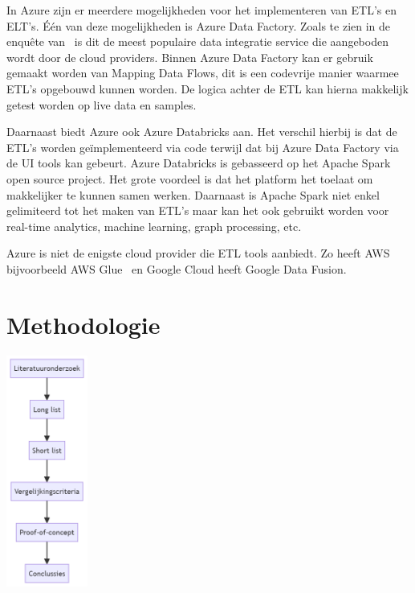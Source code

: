 In Azure zijn er meerdere mogelijkheden voor het implementeren van ETL's en ELT's. Één van deze mogelijkheden is Azure Data Factory. Zoals te zien in de enquête van~\textcite{Sreemathy2021} is dit de meest populaire data integratie service die aangeboden wordt door de cloud providers. Binnen Azure Data Factory kan er gebruik gemaakt worden van Mapping Data Flows, dit is een codevrije manier waarmee ETL's opgebouwd kunnen worden. De logica achter de ETL kan hierna makkelijk getest worden op live data en samples.~\autocite{Kromer2022a} 

Daarnaast biedt Azure ook Azure Databricks aan. Het verschil hierbij is dat de ETL's worden geïmplementeerd via code terwijl dat bij Azure Data Factory via de UI tools kan gebeurt. Azure Databricks is gebasseerd op het Apache Spark open source project. Het grote voordeel is dat het platform het toelaat om makkelijker te kunnen samen werken. Daarnaast is Apache Spark niet enkel gelimiteerd tot het maken van ETL's maar kan het ook gebruikt worden voor real-time analytics, machine learning, graph processing, etc.~\autocite{Etaati2019}

Azure is niet de enigste cloud provider die ETL tools aanbiedt. Zo heeft AWS bijvoorbeeld AWS Glue~\autocite{Khan2024} en Google Cloud heeft Google Data Fusion.~\autocite{Jaiswal2022}

\section{Methodologie}%
\label{sec:methodologie}

\begin{center}
    \includegraphics[width=0.2\textwidth]{graphics/methodologie.png}    
\end{center}

